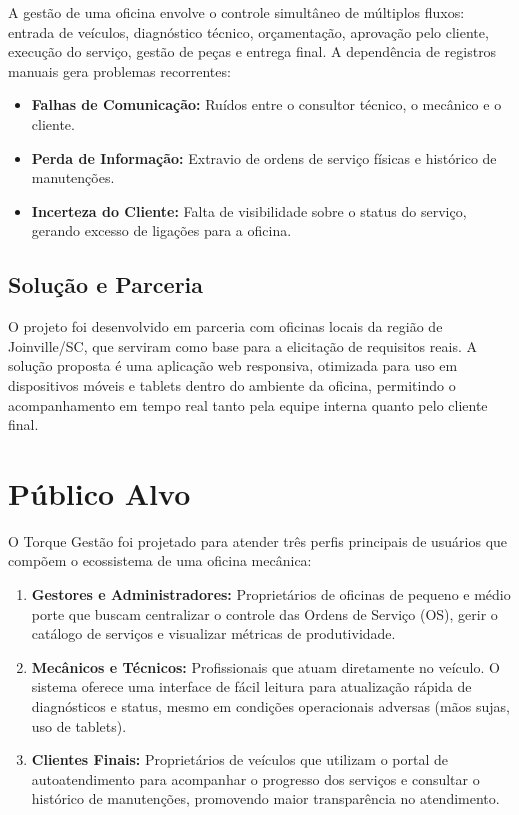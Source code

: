 \documentclass[12pt, a4paper]{article}
\begin{document}
A gestão de uma oficina envolve o controle simultâneo de múltiplos fluxos: entrada de veículos, diagnóstico técnico, orçamentação, aprovação pelo cliente, execução do serviço, gestão de peças e entrega final. A dependência de registros manuais gera problemas recorrentes:

\begin{itemize}
    \item \textbf{Falhas de Comunicação:} Ruídos entre o consultor técnico, o mecânico e o cliente.
    \item \textbf{Perda de Informação:} Extravio de ordens de serviço físicas e histórico de manutenções.
    \item \textbf{Incerteza do Cliente:} Falta de visibilidade sobre o status do serviço, gerando excesso de ligações para a oficina.
\end{itemize}

\subsection{Solução e Parceria}

O projeto foi desenvolvido em parceria com oficinas locais da região de Joinville/SC, que serviram como base para a elicitação de requisitos reais. A solução proposta é uma aplicação web responsiva, otimizada para uso em dispositivos móveis e tablets dentro do ambiente da oficina, permitindo o acompanhamento em tempo real tanto pela equipe interna quanto pelo cliente final.

\section{Público Alvo}

O Torque Gestão foi projetado para atender três perfis principais de usuários que compõem o ecossistema de uma oficina mecânica:

\begin{enumerate}
    \item \textbf{Gestores e Administradores:} Proprietários de oficinas de pequeno e médio porte que buscam centralizar o controle das Ordens de Serviço (OS), gerir o catálogo de serviços e visualizar métricas de produtividade.
    \item \textbf{Mecânicos e Técnicos:} Profissionais que atuam diretamente no veículo. O sistema oferece uma interface de fácil leitura para atualização rápida de diagnósticos e status, mesmo em condições operacionais adversas (mãos sujas, uso de tablets).
    \item \textbf{Clientes Finais:} Proprietários de veículos que utilizam o portal de autoatendimento para acompanhar o progresso dos serviços e consultar o histórico de manutenções, promovendo maior transparência no atendimento.
\end{enumerate}
\end{document}
